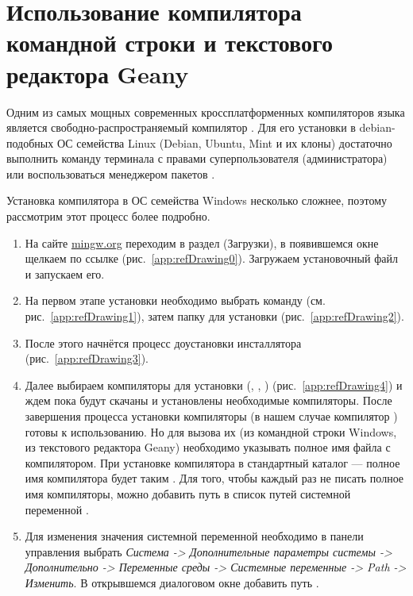 \chapter{Использование компилятора командной строки и текстового редактора Geany}

Одним из самых мощных современных кроссплатформенных компиляторов языка  является свободно-распространяемый
компилятор . Для его установки в debian-подобных ОС семейства Linux (Debian, Ubuntu, Mint и их клоны) достаточно
выполнить команду терминала  с правами суперпользователя (администратора) или
воспользоваться менеджером пакетов .

Установка компилятора  в ОС семейства Windows несколько сложнее, поэтому  рассмотрим этот процесс более подробно.

\begin{enumerate}
\item На сайте \url{mingw.org} переходим в раздел  (Загрузки), в появившемся окне щелкаем по ссылке
 (рис.~\ref{app:refDrawing0}). Загружаем установочный файл и запускаем его.
\item На первом этапе установки необходимо выбрать команду  (см. рис.~\ref{app:refDrawing1}), затем
папку для установки (рис.~\ref{app:refDrawing2}).
\item После этого начнётся процесс доустановки инсталлятора (рис.~\ref{app:refDrawing3}).
\item Далее выбираем компиляторы для установки (, , ) (рис.~\ref{app:refDrawing4}) и ждем пока будут
скачаны и установлены необходимые компиляторы. После завершения процесса установки компиляторы (в нашем случае
компилятор ) готовы к использованию. Но для вызова их (из командной строки Windows, из текстового редактора Geany)
необходимо указывать полное имя файла с компилятором. При установке компилятора  в стандартный каталог
 --- полное имя компилятора  будет таким
. Для того, чтобы каждый раз не писать полное имя
компиляторы, можно добавить путь   в список путей системной
переменной .
\item Для изменения значения системной переменной  необходимо в панели управления выбрать \emph{Система ->
Дополнительные параметры системы -> Дополнительно -> Переменные среды -> Системные переменные -> Path -> Изменить}. В
открывшемся диалоговом окне добавить путь .
\end{enumerate}


